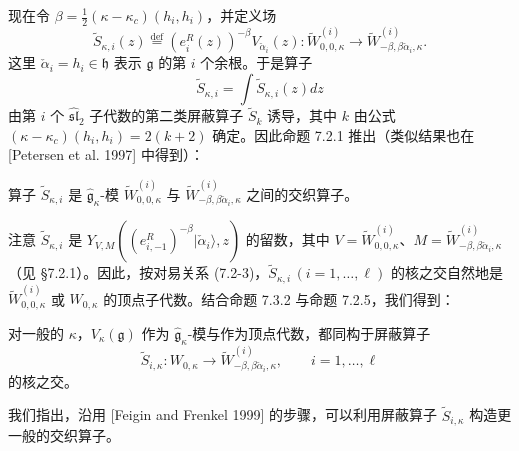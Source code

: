 现在令 $\beta=\frac{1}{2}(\kappa-\kappa_c)(h_i,h_i)$，并定义场
\begin{equation}
    \widetilde{S}_{\kappa,i}(z)\overset{\mathrm{def}}{=}(e_i^R(z))^{-\beta}V_{\check{\alpha}_i}(z):
    \widetilde{W}_{0,0,\kappa}^{(i)}\longrightarrow\widetilde{W}_{-\beta,\beta\check{\alpha}_i,\kappa}^{(i)}.
    \tag{7.3-5}
\end{equation}
这里 $\check{\alpha}_i=h_i\in\mathfrak{h}$ 表示 $\mathfrak{g}$ 的第 $i$ 个余根。于是算子
\[
    \widetilde{S}_{\kappa,i}=\int\widetilde{S}_{\kappa,i}(z)dz
\]
由第 $i$ 个 $\widehat{\mathfrak{sl}}_2$ 子代数的第二类屏蔽算子 $\widetilde{S}_k$ 诱导，其中 $k$ 由公式 $(\kappa-\kappa_c)(h_i,h_i)=2(k+2)$ 确定。因此命题 7.2.1 推出（类似结果也在 [Petersen et al. 1997] 中得到）：

\begin{proposition}
    算子 $\widetilde{S}_{\kappa,i}$ 是 $\hat{\mathfrak{g}}_\kappa$-模 $\widetilde{W}_{0,0,\kappa}^{(i)}$ 与 $\widetilde{W}_{-\beta,\beta\check{\alpha}_i,\kappa}^{(i)}$ 之间的交织算子。
\end{proposition}

注意 $\widetilde{S}_{\kappa,i}$ 是 $Y_{V,M}((e_{i,-1}^R)^{-\beta}|\check{\alpha}_i\rangle,z)$ 的留数，其中 $V=\widetilde{W}_{0,0,\kappa}^{(i)}$、$M=\widetilde{W}_{-\beta,\beta\check{\alpha}_i,\kappa}^{(i)}$（见 §7.2.1）。因此，按对易关系 (7.2-3)，$\widetilde{S}_{\kappa,i}\,(i=1,\dots,\ell)$ 的核之交自然地是 $\widetilde{W}_{0,0,\kappa}^{(i)}$ 或 $W_{0,\kappa}$ 的顶点子代数。结合命题 7.3.2 与命题 7.2.5，我们得到：

\begin{proposition}
    对一般的 $\kappa$，$V_\kappa(\mathfrak{g})$ 作为 $\hat{\mathfrak{g}}_\kappa$-模与作为顶点代数，都同构于屏蔽算子
    \[
        \widetilde{S}_{i,\kappa}:W_{0,\kappa}\longrightarrow\widetilde{W}_{-\beta,\beta\check{\alpha}_i,\kappa}^{(i)},\qquad i=1,\dots,\ell
    \]
    的核之交。
\end{proposition}

我们指出，沿用 [Feigin and Frenkel 1999] 的步骤，可以利用屏蔽算子 $\widetilde{S}_{i,\kappa}$ 构造更一般的交织算子。

